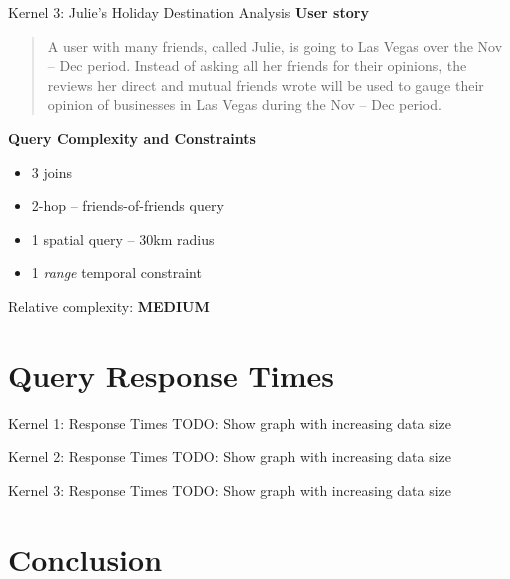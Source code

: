\begin{frame}{Kernel 3: Julie's Holiday Destination Analysis}
    \textbf{User story}
    \begin{quote}
        A user with many friends, called Julie, is going to Las Vegas over the Nov -- Dec period. Instead of asking all her friends for their opinions, the reviews her direct and mutual friends wrote will be used to gauge their opinion of businesses in Las Vegas during the Nov -- Dec period.
    \end{quote}
    \textbf{Query Complexity and Constraints}
    \begin{itemize}
        \item 3 joins
        \item 2-hop -- friends-of-friends query
        \item 1 spatial query -- 30km radius
        \item 1 \emph{range} temporal constraint
    \end{itemize}
    
    \medskip
    
    Relative complexity: \textbf{MEDIUM}
\end{frame}

\section{Query Response Times}

\begin{frame}{Kernel 1: Response Times}
    TODO: Show graph with increasing data size
\end{frame}

\begin{frame}{Kernel 2: Response Times}
    TODO: Show graph with increasing data size
\end{frame}


\begin{frame}{Kernel 3: Response Times}
    TODO: Show graph with increasing data size
\end{frame}


\section{Conclusion}

